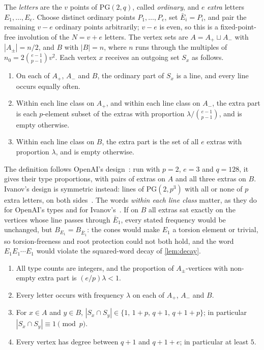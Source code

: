 \documentclass[11pt]{article}
\theoremstyle{definition}
\theoremstyle{plain}
\newcommand{\PG}{\mathrm{PG}}
\begin{document}
\begin{definition}\label{def:types}
The \emph{letters} are the $v$ points of $\PG(2,q)$, called \emph{ordinary}, and $e$ \emph{extra} letters $E_1,\dots,E_e$. Choose distinct ordinary points $P_1,\dots,P_e$, set $\bar E_i=P_i$, and pair the remaining $v-e$ ordinary points arbitrarily; $v-e$ is even, so this is a fixed-point-free involution of the $N=v+e$ letters. The vertex sets are $A=A_+\sqcup A_-$ with $|A_\pm|=n/2$, and $B$ with $|B|=n$, where $n$ runs through the multiples of $n_0=2\binom{e-1}{p-1}v^2$. Each vertex $x$ receives an outgoing set $S_x$ as follows.
\begin{enumerate}[label=\textup{(\roman*)},itemsep=0pt]
\item On each of $A_+$, $A_-$ and $B$, the ordinary part of $S_x$ is a line, and every line occurs equally often.
\item Within each line class on $A_+$, and within each line class on $A_-$, the extra part is each $p$-element subset of the extras with proportion $\lambda/\binom{e-1}{p-1}$, and is empty otherwise.
\item Within each line class on $B$, the extra part is the set of all $e$ extras with proportion $\lambda$, and is empty otherwise.
\end{enumerate}
\end{definition}

The definition follows OpenAI's design~\cite[\S2.1]{OAI196}: run with $p=2$, $e=3$ and $q=128$, it gives their type proportions, with pairs of extras on $A$ and all three extras on $B$. Ivanov's design is symmetric instead: lines of $\PG(2,p^3)$ with all or none of $p$ extra letters, on both sides~\cite[Constructions~3.1 and~3.2]{Ivanov2026}. The words \emph{within each line class} matter, as they do for OpenAI's types and for Ivanov's~\cite[Construction~3.2(ii)]{Ivanov2026}. If on $B$ all extras sat exactly on the vertices whose line passes through $\bar E_1$, every stated frequency would be unchanged, but $B_{E_1}=B_{\bar E_1}$: the cones would make $E_1$ a torsion element or trivial, so torsion-freeness and root protection could not both hold, and the word $E_1E_1\cdots E_1$ would violate the squared-word decay of \cref{lem:decay}.

\begin{lemma}\label{lem:design}
\begin{enumerate}[label=\textup{(\alph*)},itemsep=0pt]
\item All type counts are integers, and the proportion of $A_\pm$-vertices with non-empty extra part is $(e/p)\lambda<1$.
\item Every letter occurs with frequency $\lambda$ on each of $A_+$, $A_-$ and $B$.
\item For $x\in A$ and $y\in B$, $|S_x\cap S_y|\in\{1,\,1+p,\,q+1,\,q+1+p\}$; in particular $|S_x\cap S_y|\equiv1\pmod p$.
\item Every vertex has degree between $q+1$ and $q+1+e$; in particular at least $5$.
\end{enumerate}
\end{lemma}
\end{document}
